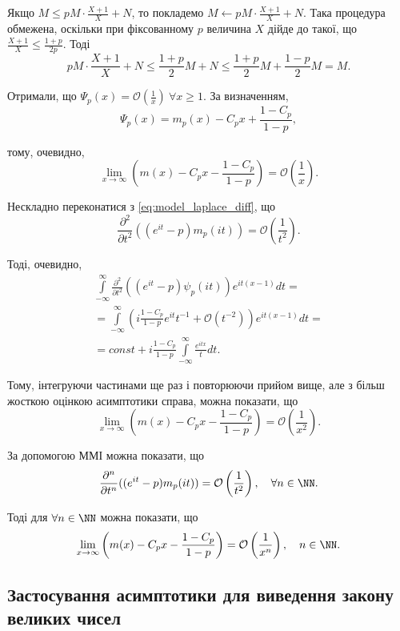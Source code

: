 Якщо $M \leq p M \cdot \frac{X+1}{X} + N$, то покладемо $M \leftarrow p M \cdot \frac{X+1}{X} + N$. Така процедура обмежена, оскільки при фіксованному $p$ величина $X$ дійде до такої, що $\frac{X+1}{X} \leq \frac{1+p}{2p}$. Тоді
\begin{equation*}
p M \cdot \frac{X+1}{X} + N \leq \frac{1+p}{2} M + N \leq \frac{1+p}{2} M + \frac{1-p}{2} M = M.
\end{equation*}

Отримали, що $\Psi_{p}(x) = \mathcal{O}\left(\frac{1}{x}\right) ~ \forall x \geq 1$. За визначенням, 
\begin{equation*}
\Psi_{p}(x) = m_{p}(x) - C_{p} x + \frac{1 - C_p}{1-p},
\end{equation*}

тому, очевидно, 
\begin{equation*}
\lim\limits_{x \rightarrow \infty} \left( m(x) - C_{p} x - \frac{1 - C_{p}}{1 - p} \right) = \mathcal{O}\left(\frac{1}{x}\right).
\end{equation*}

Нескладно переконатися з \eqref{eq:model_laplace_diff}, що
\begin{equation*}
\frac{\partial^2}{\partial t^2}((e^{it} - p) m_{p}(it))= \mathcal{O}\left(\frac{1}{t^2}\right).
\end{equation*}

Тоді, очевидно,
\begin{gather*}
\int\limits_{-\infty}^{\infty}  \frac{\partial^2}{\partial t^2}((e^{it} - p) \psi_{p}(it)) e^{it(x-1)} dt = \\
= \int\limits_{-\infty}^{\infty} \left(i \frac{1-C_{p}}{1 - p} e^{it} t^{-1} + \mathcal{O}(t^{-2}) \right) e^{it(x-1)} dt = \\
= const + i\frac{1-C_{p}}{1 - p} \int\limits_{-\infty}^{\infty} \frac{e^{itx}}{t} dt.
\end{gather*}

Тому, інтегруючи частинами ще раз і повторюючи прийом вище, але з більш жосткою оцінкою асимптотики справа, можна показати, що
\begin{equation*}
\lim\limits_{x \rightarrow \infty} \left( m(x) - C_{p} x - \frac{1 - C_{p}}{1 - p} \right) = \mathcal{O}\left(\frac{1}{x^2}\right).
\end{equation*}

За допомогою ММІ можна показати, що
\begin{equation*}
\frac{\partial^n}{\partial t^n}((e^{it} - p) m_{p}(it))= \mathcal{O}\left(\frac{1}{t^2}\right),  \quad \forall n \in \NN.
\end{equation*}

Тоді для $\forall n \in \NN$ можна показати, що
\begin{equation}
\label{eq:uniform_right_as_enhanced}
\lim\limits_{x \rightarrow \infty} \left( m(x) - C_{p} x - \frac{1 - C_{p}}{1 - p} \right) = \mathcal{O}\left(\frac{1}{x^n}\right), \quad n \in \NN.
\end{equation}

\subsection{Застосування асимптотики для виведення закону великих чисел}


